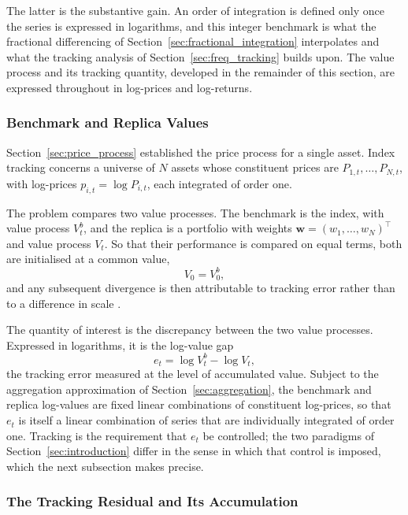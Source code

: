 \documentclass[12pt,a4paper]{article}
\begin{document}
The latter is the substantive gain. An order of integration is defined
only once the series is expressed in logarithms, and this integer
benchmark is what the fractional differencing of
Section~\ref{sec:fractional_integration} interpolates and what the
tracking analysis of Section~\ref{sec:freq_tracking} builds upon. The
value process and its tracking quantity, developed in the remainder of
this section, are expressed throughout in log-prices and log-returns.

\subsubsection{Benchmark and Replica Values}
\label{sec:value_objects}

Section~\ref{sec:price_process} established the price process for a single
asset. Index tracking concerns a universe of $N$ assets whose constituent
prices are $P_{1,t},\dots,P_{N,t}$, with log-prices
$p_{i,t}=\log P_{i,t}$, each integrated of order one.

The problem compares two value processes. The benchmark is the index, with
value process $V_t^b$, and the replica is a portfolio with weights
$\mathbf{w}=(w_1,\dots,w_N)^\top$ and value process $V_t$. So that their
performance is compared on equal terms, both are initialised at a common
value,
\begin{equation}
    V_0 = V_0^b,
\end{equation}
and any subsequent divergence is then attributable to tracking error
rather than to a difference in scale \citep{BenidisFengPalomar2018}.

The quantity of interest is the discrepancy between the two value
processes. Expressed in logarithms, it is the log-value gap
\begin{equation}
    e_t = \log V_t^b - \log V_t,
\end{equation}
the tracking error measured at the level of accumulated value. Subject to
the aggregation approximation of Section~\ref{sec:aggregation}, the
benchmark and replica log-values are fixed linear combinations of
constituent log-prices, so that $e_t$ is itself a linear combination of
series that are individually integrated of order one. Tracking is the
requirement that $e_t$ be controlled; the two paradigms of
Section~\ref{sec:introduction} differ in the sense in which that control
is imposed, which the next subsection makes precise.

\subsubsection{The Tracking Residual and Its Accumulation}
\label{sec:residual_accumulation}
\end{document}
